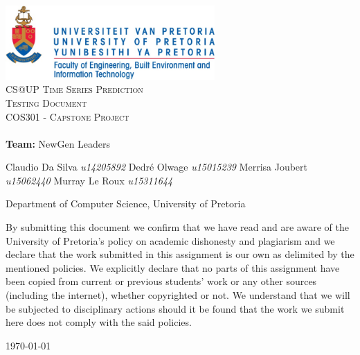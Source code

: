 \documentclass[a4paper,12pt]{article}
\begin{document}
	
	\begin{titlepage}
		\begin{center}
			
			\includegraphics[width=0.6\textwidth]{../images/up_logo.jpg}\\[2.0cm] 
			
			
			\textsc{\LARGE CS@UP Time Series Prediction}\\[1.0cm]
			
			
			\textsc{\Large Testing Document}\\[0.75cm]
			
			
			\textsc{\Large COS301 - Capstone Project}\\[0.75cm]
			
			
			\textbf{\huge \\ Team:}
			\huge NewGen Leaders \\
			\begin{flushright} \large
				Claudio Da Silva		\emph{u14205892} \newline
				Dedr\'e Olwage	    	\emph{u15015239} \newline
				Merrisa Joubert			\emph{u15062440} \newline
				Murray Le Roux	    	\emph{u15311644} \newline
			\end{flushright}
			\small Department of Computer Science, University of Pretoria \\ 
			
			
		\end{center}
		
		\noindent By submitting this document we confirm that we have read and are aware of the University of Pretoria's policy on academic dishonesty and plagiarism and we declare that the work submitted in this assignment is our own as delimited by the mentioned policies. We explicitly declare that no parts of this assignment have been copied from current or previous students' work or any other sources (including the internet), whether copyrighted or not. We understand that we will be subjected to disciplinary actions should it be found that the work we submit here does not comply with the said policies.
		
		\begin{center}
			
			\vfill
			
			{\large \today}
			
		\end{center}
		
	\end{titlepage}
    
\end{document}
